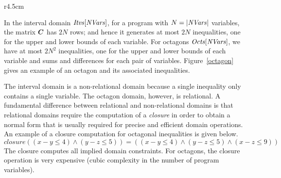 %
\begin{wrapfigure}{r}{4.5cm}
\vspace*{-7ex}
\caption{Example of an octagon}\label{octagon}
\vspace*{-5ex}
\end{wrapfigure} 
%
In the interval domain $\mathit{Itvs}[\mathit{NVars}]$,
for a program with $N=|\mathit{NVars}|$ variables, the matrix ${\boldsymbol C}$ 
has $2N$ rows; and hence it generates at most $2N$ inequalities, one
for the upper and lower bounds of each variable.
%
For octagons $\mathit{Octs}[\mathit{NVars}]$, we have at most $2N^2$
inequalities, one for the upper and lower bounds of each variable and
sums and differences for each pair of variables. Figure~\ref{octagon}
gives an example of an octagon and its associated inequalities.

The interval domain is a non-relational domain because a single
inequality only contains a single variable.
%
The octagon domain, however, is relational.  A fundamental difference
between relational and non-relational domains is that relational
domains require the computation of a \emph{closure} in order to obtain
a normal form that is usually required for precise and efficient 
domain operations.  An example of a closure computation for octagonal 
inequalities is given below.
%
\[\mathit{closure}((x-y \leq 4) \wedge (y-z \leq 5))=((x-y \leq 4) \wedge (y-z \leq 5) \wedge (x-z \leq 9)) \]  
%
The closure computes all implied domain constraints.  For octagons,
the closure operation is very expensive (cubic complexity in the
number of program variables).
%

